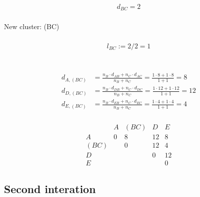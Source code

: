 \subsubsection{\stepone}
\[
d_{BC} = 2
\]
\subsubsection*{\steptwo}
New cluster: (BC) 
\subsubsection*{\stepthree}
\[l_{BC} := 2 /2 = 1\] \\
\begin{center}
\end{center}
\subsubsection*{\stepfour}
\begin{align*}
    d_{A, (BC)} & = \frac{n_{B} \cdot  d_{AB} + n_{C} \cdot  d_{AC}}{n_B + n_C}   = \frac{1 \cdot 8 + 1 \cdot 8}{1 + 1} = 8 \\
    d_{D, (BC)} & = \frac{n_{B} \cdot  d_{DB} + n_{C} \cdot  d_{DC}}{n_B + n_C}   = \frac{1 \cdot 12 + 1 \cdot 12}{1 + 1} = 12 \\
    d_{E, (BC)} & = \frac{n_{B} \cdot  d_{EB} + n_{C} \cdot  d_{EC}}{n_B + n_C}   = \frac{1 \cdot 4 + 1 \cdot 4}{1 + 1} = 4
\end{align*}
\subsubsection*{\stepfive}
\[
\begin{array}{c|ccccc}
  & A & (BC) & D & E \\
\hline
A & 0& 8 & 12& 8 \\
(BC) &  & 0 & 12 & 4 \\
D &  &   & 0 & 12 \\
E &  &   &   & 0
\end{array}
\]
\subsection*{Second interation}
